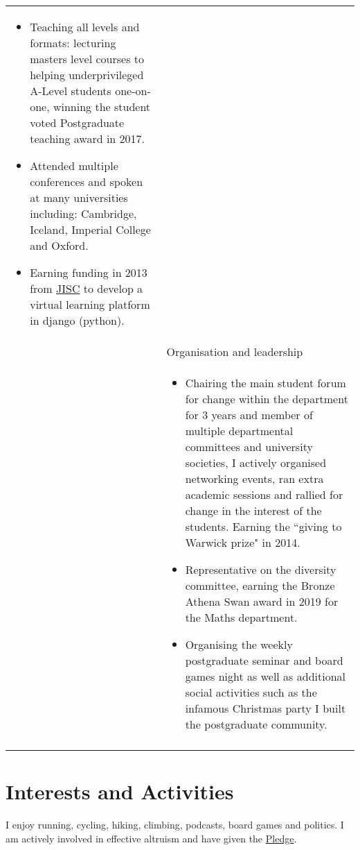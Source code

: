 \documentclass[a4paper,10pt]{article}
\newcommand{\tab}{\hspace{10 pt}}
\begin{document}
\begin{tabular}{p{2.25cm}|p{15cm}}
\begin{itemize}
	\item Teaching all levels and formats: lecturing masters level courses to helping underprivileged A-Level students one-on-one, winning the student voted Postgraduate teaching award in 2017.
	\item Attended multiple conferences and spoken at many universities including: Cambridge, Iceland, Imperial College and Oxford.
	\item Earning funding in 2013 from \href{https://www.jisc.ac.uk/}{JISC} to develop a virtual learning platform in django (python).
	\end{itemize}\vspace{-0.15 in}\\
  	 & \tab \large{Organisation and leadership}\\
	 & \vspace{-0.07 in}\begin{itemize}
	\item Chairing the main student forum for change within the department for 3 years and member of multiple departmental committees and university societies, I actively organised networking events, ran extra academic sessions and rallied for change in the interest of the students. Earning the ``giving to Warwick prize" in 2014.
	\item Representative on the diversity committee, earning the Bronze Athena Swan award in 2019 for the Maths department. 
	\item Organising the weekly postgraduate seminar and board games night as well as additional social activities such as the infamous Christmas party I built the postgraduate community.	
\end{itemize}\vspace{-0.15 in}\\
\multicolumn{2}{c}{} \\
\end{tabular}
\vspace{-0.5cm}

\section{Interests and Activities}
I enjoy running, cycling, hiking, climbing, podcasts, board games and politics. I am actively involved in effective altruism and have given the \href{https://www.givingwhatwecan.org/}{Pledge}.
\end{document}
